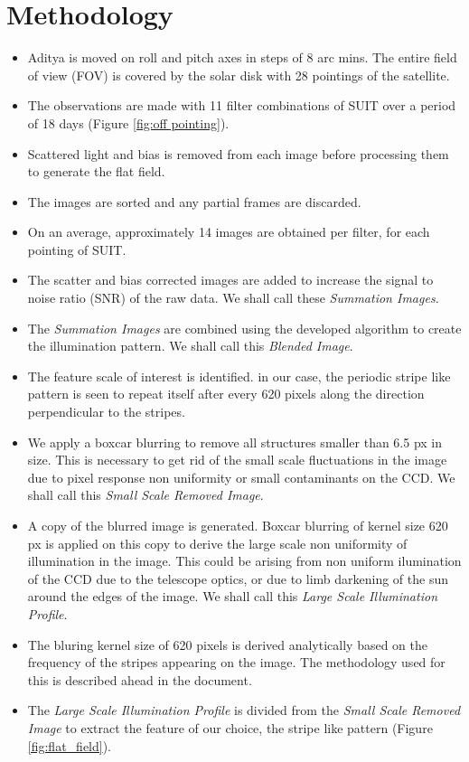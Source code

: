 \documentclass[11pt,a4paper]{article}
\begin{document}
	\section{Methodology}
	\begin{itemize}
		\item Aditya is moved on roll and pitch axes in steps of 8 arc mins. The entire field of view (FOV) is covered by the solar disk with 28 pointings of the satellite.
		\item The observations are made with 11 filter combinations of SUIT over a period of 18 days (Figure \ref{fig:off pointing}).
		\item Scattered light and bias is removed from each image before processing them to generate the flat field.
		\item The images are sorted and any partial frames are discarded.
		\item On an average, approximately 14 images are obtained per filter, for each pointing of SUIT.
		\item The scatter and bias corrected images are added to increase the signal to noise ratio (SNR) of the raw data. We shall call these \textit{Summation Images.}
		\item The \textit{Summation Images} are combined using the developed algorithm to create the illumination pattern. We shall call this \textit{Blended Image}.
		\item The feature scale of interest is identified. in our case, the periodic stripe like pattern is seen to repeat itself after every 620 pixels along the direction perpendicular to the stripes.
		\item We apply a boxcar blurring to remove all structures smaller than 6.5 px in size. This is necessary to get rid of the small scale fluctuations in the image due to pixel response non uniformity or small contaminants on the CCD. We shall call this \textit{Small Scale Removed Image}.
		\item A copy of the blurred image is generated. Boxcar blurring of kernel size 620 px is applied on this copy to derive the large scale non uniformity of illumination in the image. This could be arising from non uniform ilumination of the CCD due to the telescope optics, or due to limb darkening of the sun around the edges of the image. We shall call this \textit{Large Scale Illumination Profile}.
		\item The bluring kernel size of 620 pixels is derived analytically based on the frequency of the stripes appearing on the image. The methodology used for this is described ahead in the document.
		\item The \textit{Large Scale Illumination Profile} is divided from the \textit{Small Scale Removed Image} to extract the feature of our choice, the stripe like pattern (Figure \ref{fig:flat_field}).
	\end{itemize}
	
\end{document}
